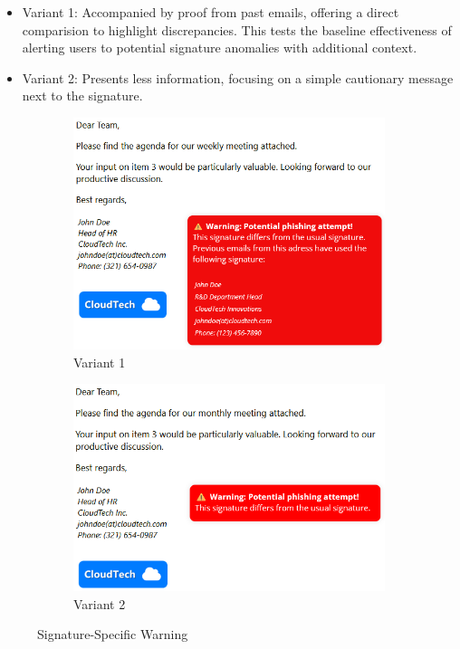 \documentclass[
  a4paper,  %
  twoside,  %
  bibliography=totoc,
  headsepline,
  cleardoublepage=empty,
  parskip=half,
  draft=false
]{scrbook}
\begin{document}
\begin{itemize}
    \item Variant 1: Accompanied by proof from past emails, offering a direct comparision to highlight discrepancies. This tests the baseline effectiveness of alerting users to potential signature anomalies with additional context.
    \item Variant 2: Presents less information, focusing on a simple cautionary message next to the signature.
\end{itemize}

\begin{figure} [H]
\centering
\begin{subfigure}{.5\textwidth}
  \centering
  \includegraphics[width=.9\linewidth]{figures/signature1.png}
  \caption{Variant 1}
  \label{fig:sig1}
\end{subfigure}%
\begin{subfigure}{.5\textwidth}
  \centering
  \includegraphics[width=.9\linewidth]{figures/signature2.png}
  \caption{Variant 2}
  \label{fig:sig2}
\end{subfigure}
\caption{Signature-Specific Warning}
\label{fig:signature}
\end{figure}
\end{document}
